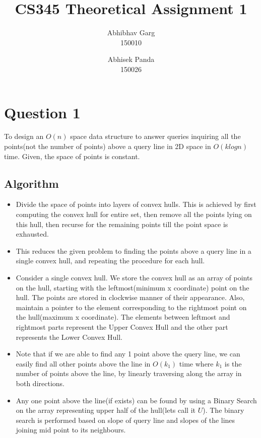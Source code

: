 \documentclass{article}
\title{CS345 Theoretical Assignment 1}
\author{Abhibhav Garg \\ 150010 \and Abhisek Panda \\ 150026}
\begin{document}
\maketitle

\section{Question 1}
To design an $O(n)$ space data structure to answer queries inquiring all the points(not the number of points) above a query line in 2D space in $O(klogn)$ time. Given, the space of points is constant.

\subsection{Algorithm}
\begin{itemize}
	\item Divide the space of points into layers of convex hulls. This is achieved by first computing the convex hull for entire set, then remove all the points lying on this hull, then recurse for the remaining points till the point space is exhausted.
	
	\item This reduces the given problem to finding the points above a query line in a single convex hull, and repeating the procedure for each hull.
	
	\item Consider a single convex hull. We store the convex hull as an array of points on the hull, starting with the leftmost(minimum x coordinate) point on the hull. The points are stored in clockwise manner of their appearance. Also, maintain a pointer to the element corresponding to the rightmost point on the hull(maximum x coordinate). The elements between leftmost and  rightmost parts represent the Upper Convex Hull and the other part represents the Lower Convex Hull.
	
	\item Note that if we are able to find any 1 point above the query line, we can easily find all other points above the  line in $O(k_1)$ time where $k_1$ is the number of points above the line, by linearly traversing along the array in both directions.
	
	\item Any one point above the line(if exists) can be found by using a Binary Search on the array representing upper half of the hull(lets call it $U$). The binary search is performed based on slope of query line and slopes of the lines joining mid point to its neighbours.
	

\end{itemize}
\end{document}
